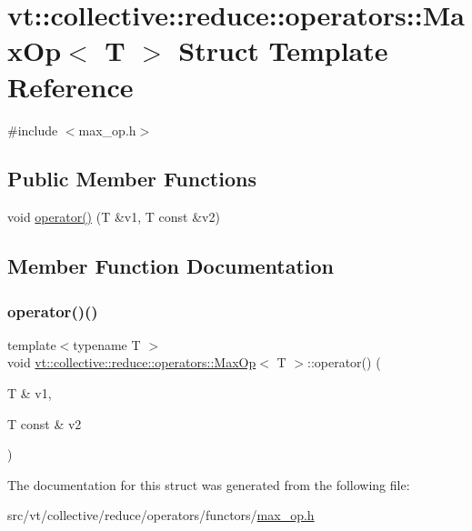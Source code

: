 \hypertarget{structvt_1_1collective_1_1reduce_1_1operators_1_1_max_op}{}\section{vt\+:\+:collective\+:\+:reduce\+:\+:operators\+:\+:Max\+Op$<$ T $>$ Struct Template Reference}
\label{structvt_1_1collective_1_1reduce_1_1operators_1_1_max_op}


{\ttfamily \#include $<$max\+\_\+op.\+h$>$}

\subsection*{Public Member Functions}
\begin{DoxyCompactItemize}
\item 
void \hyperlink{structvt_1_1collective_1_1reduce_1_1operators_1_1_max_op_aab89f5f272a308e19cd5f36f29869112}{operator()} (T \&v1, T const \&v2)
\end{DoxyCompactItemize}


\subsection{Member Function Documentation}
\mbox{\label{structvt_1_1collective_1_1reduce_1_1operators_1_1_max_op_aab89f5f272a308e19cd5f36f29869112}} 
\subsubsection{\texorpdfstring{operator()()}{operator()()}}
{\footnotesize\ttfamily template$<$typename T $>$ \\
void \hyperlink{structvt_1_1collective_1_1reduce_1_1operators_1_1_max_op}{vt\+::collective\+::reduce\+::operators\+::\+Max\+Op}$<$ T $>$\+::operator() (\begin{DoxyParamCaption}\item[{T \&}]{v1,  }\item[{T const \&}]{v2 }\end{DoxyParamCaption})\hspace{0.3cm}{\ttfamily [inline]}}



The documentation for this struct was generated from the following file\+:\begin{DoxyCompactItemize}
\item 
src/vt/collective/reduce/operators/functors/\hyperlink{max__op_8h}{max\+\_\+op.\+h}\end{DoxyCompactItemize}
